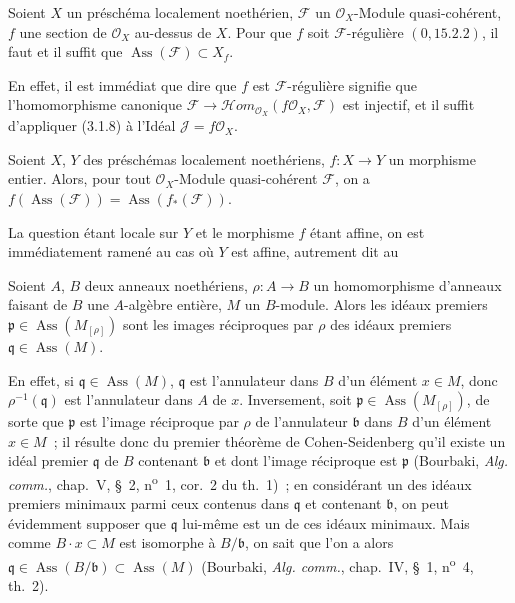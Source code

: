 \begin{corollary}[3.1.9]
\label{IV.2.3.1.9-fr}
Soient $X$ un préschéma localement noethérien, $\mathcal F$ un
$\mathcal O_X$-Module quasi-cohérent, $f$ une section de $\mathcal O_X$
au-dessus de $X$. Pour que $f$ soit $\mathcal F$-régulière
$(0,15.2.2)$, il faut et il suffit que
$\operatorname{Ass}(\mathcal F)\subset X_f$.
\end{corollary}

En effet, il est immédiat que dire que $f$ est $\mathcal F$-régulière signifie
que l'homomorphisme canonique
$\mathcal F\to\mathcal Hom_{\mathcal O_X}(f\mathcal O_X,\mathcal F)$ est
injectif, et il suffit d'appliquer (3.1.8) à l'Idéal
$\mathcal J=f\mathcal O_X$.

\begin{proposition}[3.1.10]
\label{IV.2.3.1.10-fr}
Soient $X$, $Y$ des préschémas localement noethériens, $f:X\to Y$ un
morphisme entier. Alors, pour tout $\mathcal O_X$-Module quasi-cohérent
$\mathcal F$, on a
$f(\operatorname{Ass}(\mathcal F))=\operatorname{Ass}(f_*(\mathcal F))$.
\end{proposition}

La question étant locale sur $Y$ et le morphisme $f$ étant affine, on est
immédiatement ramené au cas où $Y$ est affine, autrement dit au

\begin{lemma}[3.1.10.1]
\label{IV.2.3.1.10.1-fr}
Soient $A$, $B$ deux anneaux noethériens, $\rho:A\to B$ un homomorphisme
d'anneaux faisant de $B$ une $A$-algèbre entière, $M$ un $B$-module. Alors les
idéaux premiers $\mathfrak p\in\operatorname{Ass}(M_{[\rho]})$ sont les images
réciproques par $\rho$ des idéaux premiers
$\mathfrak q\in\operatorname{Ass}(M)$.
\end{lemma}

En effet, si $\mathfrak q\in\operatorname{Ass}(M)$, $\mathfrak q$ est
l'annulateur dans $B$ d'un élément $x\in M$, donc
$\rho^{-1}(\mathfrak q)$ est l'annulateur dans $A$ de $x$. Inversement, soit
$\mathfrak p\in\operatorname{Ass}(M_{[\rho]})$, de sorte que $\mathfrak p$
est l'image réciproque par $\rho$ de l'annulateur $\mathfrak b$ dans $B$ d'un
élément $x\in M$~; il résulte donc du premier théorème de Cohen-Seidenberg
qu'il existe un idéal premier $\mathfrak q$ de $B$ contenant $\mathfrak b$ et
dont l'image réciproque est $\mathfrak p$ (Bourbaki, \emph{Alg. comm.},
chap.~V, \S~2, n\textsuperscript{o}~1, cor.~2 du th.~1)~; en considérant un
des idéaux premiers minimaux parmi ceux contenus dans $\mathfrak q$ et
contenant $\mathfrak b$, on peut évidemment supposer que $\mathfrak q$
lui-même est un de ces idéaux minimaux. Mais comme $B\cdot x\subset M$ est
isomorphe à $B/\mathfrak b$, on sait que l'on a alors
$\mathfrak q\in\operatorname{Ass}(B/\mathfrak b)\subset\operatorname{Ass}(M)$
(Bourbaki, \emph{Alg. comm.}, chap.~IV, \S~1, n\textsuperscript{o}~4,
th.~2).

